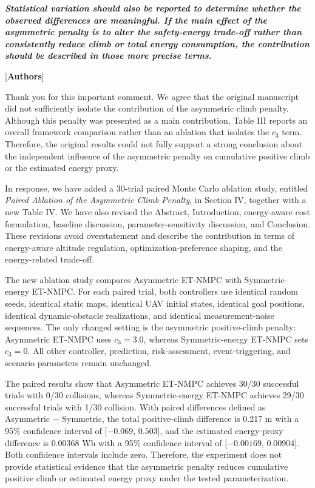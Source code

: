 \documentclass[12pt, twosides]{article}
\theoremstyle{definition}
\begin{document}
\textit{\textbf{Statistical variation should also be reported to determine whether the observed differences are meaningful. If the main effect of the asymmetric penalty is to alter the safety-energy trade-off rather than consistently reduce climb or total energy consumption, the contribution should be described in those more precise terms.}}

\textcolor[rgb]{0.00,0.00,1.00}{[\textbf{Authors}]}

Thank you for this important comment. We agree that the original manuscript did not sufficiently isolate the contribution of the asymmetric climb penalty. Although this penalty was presented as a main contribution, Table III reports an overall framework comparison rather than an ablation that isolates the $c_3$ term. Therefore, the original results could not fully support a strong conclusion about the independent influence of the asymmetric penalty on cumulative positive climb or the estimated energy proxy.

In response, we have added a 30-trial paired Monte Carlo ablation study, entitled \textit{Paired Ablation of the Asymmetric Climb Penalty}, in Section IV, together with a new Table IV. We have also revised the Abstract, Introduction, energy-aware cost formulation, baseline discussion, parameter-sensitivity discussion, and Conclusion. These revisions avoid overstatement and describe the contribution in terms of energy-aware altitude regulation, optimization-preference shaping, and the energy-related trade-off.

The new ablation study compares Asymmetric ET-NMPC with Symmetric-energy ET-NMPC. For each paired trial, both controllers use identical random seeds, identical static maps, identical UAV initial states, identical goal positions, identical dynamic-obstacle realizations, and identical measurement-noise sequences. The only changed setting is the asymmetric positive-climb penalty: Asymmetric ET-NMPC uses $c_3=3.0$, whereas Symmetric-energy ET-NMPC sets $c_3=0$. All other controller, prediction, risk-assessment, event-triggering, and scenario parameters remain unchanged.

The paired results show that Asymmetric ET-NMPC achieves 30/30 successful trials with 0/30 collisions, whereas Symmetric-energy ET-NMPC achieves 29/30 successful trials with 1/30 collision. With paired differences defined as Asymmetric $-$ Symmetric, the total positive-climb difference is 0.217 m with a 95\% confidence interval of [$-0.069$, $0.503$], and the estimated energy-proxy difference is 0.00368 Wh with a 95\% confidence interval of [$-0.00169$, $0.00904$]. Both confidence intervals include zero. Therefore, the experiment does not provide statistical evidence that the asymmetric penalty reduces cumulative positive climb or estimated energy proxy under the tested parameterization.
\end{document}
